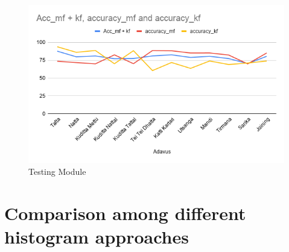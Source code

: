 \begin{figure}[H]
    \hspace{-2.5cm}
    \includegraphics[scale= 0.8]{./Pictures/local.png}
    \caption{Testing Module}
    \label{fig:Ch06F003}
\end{figure}





\section{Comparison among different histogram approaches}







